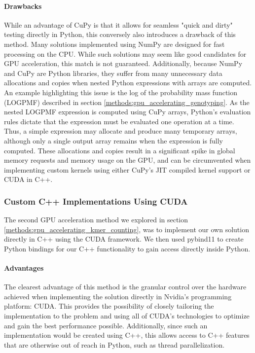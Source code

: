 \paragraph{Drawbacks}
While an advantage of CuPy is that it allows for seamless "quick and dirty" testing directly in Python, this conversely also introduces a drawback of this method.
Many solutions implemented using NumPy are designed for fast processing on the CPU.
While such solutions may seem like good candidates for GPU acceleration, this match is not guaranteed.
Additionally, because NumPy and CuPy are Python libraries, they suffer from many unnecessary data allocations and copies when nested Python expressions with arrays are computed.
An example highlighting this issue is the log of the probability mass function (LOGPMF) described in section \ref{methods:gpu_accelerating_genotyping}.
As the nested LOGPMF expression is computed using CuPy arrays, Python's evaluation rules dictate that the expression must be evaluated one operation at a time.
Thus, a simple expression may allocate and produce many temporary arrays, although only a single output array remains when the expression is fully computed.
These allocations and copies result in a significant spike in global memory requests and memory usage on the GPU, and can be circumvented when implementing custom kernels using either CuPy's JIT compiled kernel support or CUDA in C++.

\subsubsection{Custom C++ Implementations Using CUDA}
The second GPU acceleration method we explored in section \ref{methods:gpu_accelerating_kmer_counting}, was to implement our own solution directly in C++ using the CUDA framework.
We then used pybind11 to create Python bindings for our C++ functionality to gain access directly inside Python.

\paragraph{Advantages}
The clearest advantage of this method is the granular control over the hardware achieved when implementing the solution directly in Nvidia's programming platform: CUDA.
This provides the possibility of closely tailoring the implementation to the problem and using all of CUDA's technologies to optimize and gain the best performance possible.
Additionally, since such an implementation would be created using C++, this allows access to C++ features that are otherwise out of reach in Python, such as thread parallelization.

